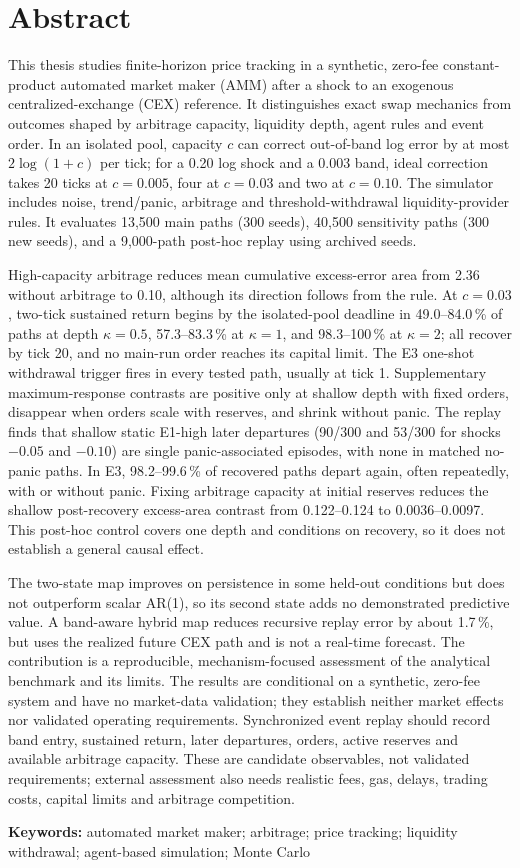 \section{Abstract}

This thesis studies finite-horizon price tracking in a synthetic, zero-fee constant-product automated market maker (AMM) after a shock to an exogenous centralized-exchange (CEX) reference. It distinguishes exact swap mechanics from outcomes shaped by arbitrage capacity, liquidity depth, agent rules and event order. In an isolated pool, capacity $c$ can correct out-of-band log error by at most $2\log(1+c)$ per tick; for a 0.20 log shock and a 0.003 band, ideal correction takes 20 ticks at $c=0.005$, four at $c=0.03$ and two at $c=0.10$. The simulator includes noise, trend/panic, arbitrage and threshold-withdrawal liquidity-provider rules. It evaluates 13,500 main paths (300 seeds), 40,500 sensitivity paths (300 new seeds), and a 9,000-path post-hoc replay using archived seeds.

High-capacity arbitrage reduces mean cumulative excess-error area from 2.36 without arbitrage to 0.10, although its direction follows from the rule. At $c=0.03$, two-tick sustained return begins by the isolated-pool deadline in 49.0--84.0\,\% of paths at depth $\kappa=0.5$, 57.3--83.3\,\% at $\kappa=1$, and 98.3--100\,\% at $\kappa=2$; all recover by tick 20, and no main-run order reaches its capital limit. The E3 one-shot withdrawal trigger fires in every tested path, usually at tick 1. Supplementary maximum-response contrasts are positive only at shallow depth with fixed orders, disappear when orders scale with reserves, and shrink without panic. The replay finds that shallow static E1-high later departures (90/300 and 53/300 for shocks $-0.05$ and $-0.10$) are single panic-associated episodes, with none in matched no-panic paths. In E3, 98.2--99.6\,\% of recovered paths depart again, often repeatedly, with or without panic. Fixing arbitrage capacity at initial reserves reduces the shallow post-recovery excess-area contrast from 0.122--0.124 to 0.0036--0.0097. This post-hoc control covers one depth and conditions on recovery, so it does not establish a general causal effect.

The two-state map improves on persistence in some held-out conditions but does not outperform scalar AR(1), so its second state adds no demonstrated predictive value. A band-aware hybrid map reduces recursive replay error by about 1.7\,\%, but uses the realized future CEX path and is not a real-time forecast. The contribution is a reproducible, mechanism-focused assessment of the analytical benchmark and its limits. The results are conditional on a synthetic, zero-fee system and have no market-data validation; they establish neither market effects nor validated operating requirements. Synchronized event replay should record band entry, sustained return, later departures, orders, active reserves and available arbitrage capacity. These are candidate observables, not validated requirements; external assessment also needs realistic fees, gas, delays, trading costs, capital limits and arbitrage competition.

\textbf{Keywords:} automated market maker; arbitrage; price tracking; liquidity withdrawal; agent-based simulation; Monte Carlo

